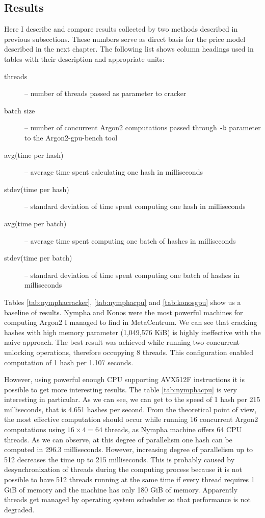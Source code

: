 \documentclass[nolof,digital]{fithesis3}
\begin{document}
\FloatBarrier

\subsection{Results}
Here I describe and compare results collected by two methods described in previous subsections. These numbers serve as direct basis for the price model described in the next chapter. The following list shows column headings used in tables with their description and appropriate units:

\begin{description}
\item[threads] -- number of threads passed as parameter to cracker

\item[batch size] -- number of concurrent Argon2 computations passed through \verb+-b+ parameter to the Argon2-gpu-bench tool

\item[avg(time per hash)] -- average time spent calculating one hash in milliseconds

\item[stdev(time per hash)] -- standard deviation of time spent computing one hash in milliseconds

\item[avg(time per batch)] -- average time spent computing one batch of hashes in milliseconds

\item[stdev(time per batch)] -- standard deviation of time spent computing one batch of hashes in milliseconds
\end{description}

Tables \ref{tab:nymphacracker}, \ref{tab:nymphacpu}  and \ref{tab:konosgpu} show us a baseline of results. Nympha and Konos were the most powerful machines for computing Argon2 I managed to find in MetaCentrum. We can see that cracking hashes with high memory parameter (1,049,576 KiB) is highly ineffective with the naive approach. The best result was achieved while running two concurrent unlocking operations, therefore occupying 8 threads. This configuration enabled computation of 1 hash per 1.107 seconds.

However, using powerful enough CPU supporting AVX512F instructions it is possible to get more interesting results. The table \ref{tab:nymphacpu} is very interesting in particular. As we can see, we can get to the speed of 1 hash per 215 milliseconds, that is 4.651 hashes per second. From the theoretical point of view, the most effective computation should occur while running 16 concurrent Argon2 computations using $16 \times 4 = 64$ threads, as Nympha machine offers 64 CPU threads. As we can observe, at this degree of parallelism one hash can be computed in 296.3 milliseconds. However, increasing degree of parallelism up to 512 decreases the time up to 215 milliseconds. This is probably caused by desynchronization of threads during the computing process because it is not possible to have 512 threads running at the same time if every thread requires 1 GiB of memory and the machine has only 180 GiB of memory. Apparently threads get managed by operating system scheduler so that performance is not degraded.
\end{document}
